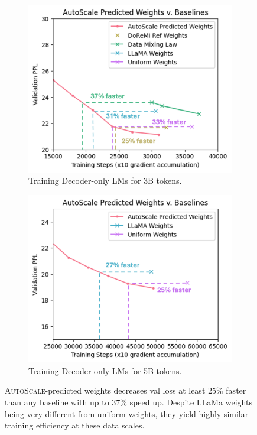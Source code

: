 \documentclass{article} %
\begin{document}
\begin{appendices}{}
\begin{figure}[h!]
    \centering
    \begin{subfigure}[b]{0.48\textwidth}
        \includegraphics[width=\textwidth]{gptfigs/as500pr.png}
        \caption{Training Decoder-only LMs for 3B tokens.}
        \label{fig:figure7a}
    \end{subfigure}
    \begin{subfigure}[b]{0.48\textwidth}
        \includegraphics[width=\textwidth]{gptfigs/as800pr.png}
        \caption{Training Decoder-only LMs for 5B tokens.}
        \label{fig:figure7b}
    \end{subfigure}
    \caption{\textsc{AutoScale}-predicted weights decreases val loss at least $25\%$ faster than any baseline with up to $37\%$ speed up. Despite LLaMa weights being very different from uniform weights, they yield highly similar training efficiency at these data scales.}
    \label{fig:gpt2_additional_3}
\end{figure}


\end{appendices}
\end{document}
